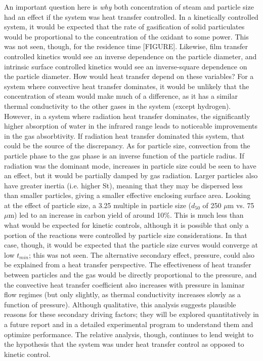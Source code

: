 \documentclass[11pt,twocolumn]{article}
\begin{document}

An important question here is \emph{why} both concentration of steam and particle size had an effect if the system was heat transfer controlled.  In a kinetically controlled system, it would be expected that the rate of gasification of solid particulates would be proportional to the concentration of the oxidant to some power.  This was not seen, though, for the residence time [FIGURE].  Likewise, film transfer controlled kinetics would see an inverse dependence on the particle diameter, and intrinsic surface controlled kinetics would see an inverse-square dependence on the particle diameter.  How would heat transfer depend on these variables?  For a system where convective heat transfer dominates, it would be unlikely that the concentration of steam would make much of a difference, as it has a similar thermal conductivity to the other gases in the system (except hydrogen).  However, in a system where radiation heat transfer dominates, the significantly higher absorption of water in the infrared range leads to noticeable improvements in the gas absorbtivity.  If radiation heat transfer dominated this system, that could be the source of the discrepancy.  As for particle size, convection from the particle phase to the gas phase is an inverse function of the particle radius.  If radiation was the dominant mode, increases in particle size could be seen to have an effect, but it would be partially damped by gas radiation.  Larger particles also have greater inertia (i.e. higher St), meaning that they may be dispersed less than smaller particles, giving a smaller effective enclosing surface area.  Looking at the effect of particle size, a 3.25 multiple in particle size ($d_{50}$ of 250 $\mu$m vs. 75 $\mu$m) led to an increase in carbon yield of around 10\%.  This is much less than what would be expected for kinetic controls, although it is possible that only a portion of the reactions were controlled by particle size considerations.  In that case, though, it would be expected that the particle size curves would converge at low $t_{min}$; this was not seen.  The alternative secondary effect, pressure, could also be explained from a heat transfer perspective.  The effectiveness of heat transfer between particles and the gas would be directly proportional to the pressure, and the convective heat transfer coefficient also increases with pressure in laminar flow regimes (but only slightly, as thermal conductivity increases slowly as a function of pressure).  Although qualitative, this analysis suggests plausible reasons for these secondary driving factors; they will be explored quantitatively in a future report and in a detailed experimental program to understand them and optimize performance.  The relative analysis, though, continues to lend weight to the hypothesis that the system was under heat transfer control as opposed to kinetic control.
\end{document}
